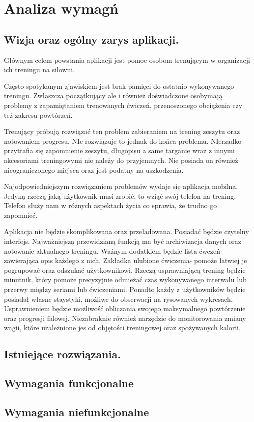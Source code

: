 \chapter[Analiza wymagań.]{Analiza wymagń}

\section{Wizja oraz ogólny zarys aplikacji.}
Głównym celem powstania aplikacji jest pomoc osobom trenującym w organizacji ich treningu na siłowni. 

Często spotykanym zjawiskiem jest brak pamięci do ostatnio wykonywanego treningu. Zwłaszcza początkujący ale i również doświadczone osobymają problemy z zapamiętaniem trenowanych ćwiczeń, przenoszonego obciążenia czy też zakresu powtórzeń.

Trenujący próbują rozwiązać ten problem zabieraniem na trening zeszytu oraz notowaniem progresu.
NIe rozwiązuje to jednak do końca problemu. NIerzadko przytrafia się zapomnienie zeszytu, długopisu a same targanie wraz z innymi akcesoriami treningowymi nie należy do przyjemnych. Nie posiada on również nieograniczonego miejsca oraz jest podatny na uszkodzenia.

Najodpowiedniejszym rozwiązaniem problemów wydaje się aplikacja mobilna. Jedyną rzeczą jaką użytkownik musi zrobić, to wziąć swój telefon na trening. Telefon służy nam w różnych aspektach życia co sprawia, że trudno go zapomnieć.

Aplikacja nie będzie skomplikowana oraz przeładowana. Posiadać będzie czytelny interfejs. Najważniejszą przewidzianą funkcją ma być archiwizacja danych oraz notowanie aktualnego treningu. Ważnym dodatkiem będzie lista ćwczeń zawierająca opis każdego z nich. Zakładka ulubione ćwiczenia- pomoże łatwiej je pogrupować oraz odszukać użytkownikowi. Rzeczą usprawniającą trening będzie minutnik, który pomoże precyzyjnie odmieżać czas wykonywanego interwału lub przerwy między seriami lub ćwiczeniami. Ponadto każdy z użytkowników będzie posiadał własne staystyki, możliwe do obserwacji na rysowanych wykresach. Usprawnieniem będzie możliwość obliczania swojego maksymalnego powtórzenie oraz progresji falowej. Niezabraknie również narzędzie do monitorowania zmiany wagii, które uzależnione jes od objętości treningowej oraz spożywanych kalorii.

\section{Istniejące rozwiązania.}

\section{Wymagania funkcjonalne}

\section{Wymagania niefunkcjonalne}